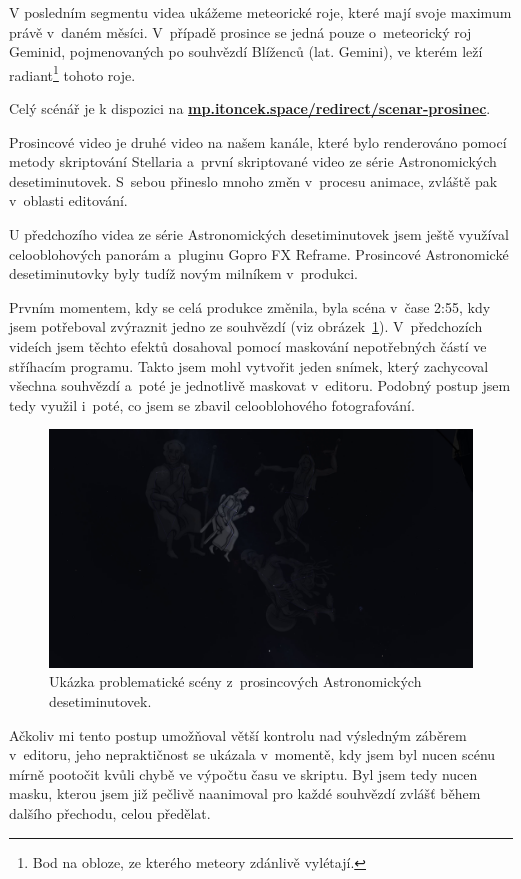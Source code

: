 \documentclass[12pt,a4paper,titlepage]{article}
\newcommand{\link}[2]{\href{#1}{\textcolor{link-color}{\textbf{#2}}}}%
\begin{document}
V posledním segmentu videa ukážeme meteorické roje, které mají svoje maximum právě v~daném měsíci. V~případě prosince se jedná pouze o~meteorický roj Geminid, pojmenovaných po souhvězdí Blíženců (lat. Gemini), ve kterém leží radiant\footnote{Bod na obloze, ze kterého meteory zdánlivě vylétají.} tohoto roje.

Celý scénář je k dispozici na \link{https://mp.itoncek.space/redirect/scenar-prosinec}{mp.itoncek.space/redirect/scenar-prosinec}.

Prosincové video je druhé video na našem kanále, které bylo renderováno pomocí metody skriptování Stellaria a~první skriptované video ze série Astronomických desetiminutovek. S~sebou přineslo mnoho změn v~procesu animace, zvláště pak v~oblasti editování. 

U předchozího videa ze série Astronomických desetiminutovek jsem ještě využíval celooblohových panorám a~pluginu Gopro FX Reframe. Prosincové Astronomické desetiminutovky byly tudíž novým milníkem v~produkci.

Prvním momentem, kdy se celá produkce změnila, byla scéna v~čase 2:55, kdy jsem potřeboval zvýraznit jedno ze souhvězdí (viz obrázek~\ref{prac:ac12_1}). V~předchozích videích jsem těchto efektů dosahoval pomocí maskování nepotřebných částí ve stříhacím programu. Takto jsem mohl vytvořit jeden snímek, který zachycoval všechna souhvězdí a~poté je jednotlivě maskovat v~editoru. Podobný postup jsem tedy využil i~poté, co jsem se zbavil celooblohového fotografování.

\begin{figure}[H]
	\centering
	\includegraphics[width=.95\textwidth]{ac12_1.png}
	\caption{Ukázka problematické scény z~prosincových Astronomických desetiminutovek.}\label{prac:ac12_1}
\end{figure}

Ačkoliv mi tento postup umožňoval větší kontrolu nad výsledným záběrem v~editoru, jeho nepraktičnost se ukázala v~momentě, kdy jsem byl nucen scénu mírně pootočit kvůli chybě ve výpočtu času ve skriptu. Byl jsem tedy nucen masku, kterou jsem již pečlivě naanimoval pro každé souhvězdí zvlášť během dalšího přechodu, celou předělat.
\end{document}
